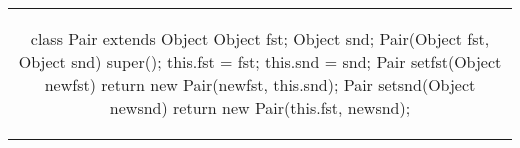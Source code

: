 \begin{tabular}{c}
\begin{java}
class Pair extends Object {
    Object fst;
    Object snd;
    Pair(Object fst, Object snd) {
        super(); this.fst = fst; this.snd = snd;
    }
    Pair setfst(Object newfst) {
        return new Pair(newfst, this.snd);
    }
    Pair setsnd(Object newsnd) {
        return new Pair(this.fst, newsnd);
    }
}
\end{java}
\end{tabular}
